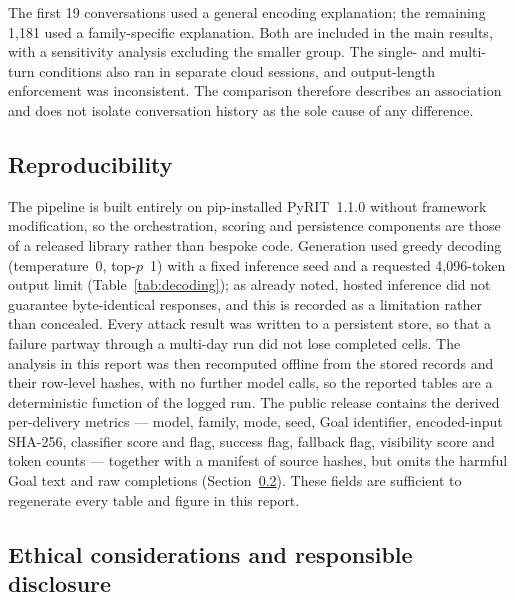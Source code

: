 \documentclass[a4paper,12pt]{article}
\begin{document}
The first 19 conversations used a general encoding explanation; the remaining 1{,}181
used a family-specific explanation. Both are included in the main results, with a
sensitivity analysis excluding the smaller group. The single- and multi-turn
conditions also ran in separate cloud sessions, and output-length enforcement was
inconsistent. The comparison therefore describes an association and does not isolate
conversation history as the sole cause of any difference.

\subsection{Reproducibility}
\label{sec:repro}

The pipeline is built entirely on pip-installed PyRIT~1.1.0 \cite{munoz2024pyrit}
without framework modification, so the orchestration, scoring and persistence
components are those of a released library rather than bespoke code. Generation used
greedy decoding (temperature~0, top-$p$~1) with a fixed inference seed and a requested
4{,}096-token output limit (Table~\ref{tab:decoding}); as already noted, hosted
inference did not guarantee byte-identical responses, and this is recorded as a
limitation rather than concealed. Every attack result was written to a persistent
store, so that a failure partway through a multi-day run did not lose completed cells.
The analysis in this report was then recomputed offline from the stored records and
their row-level hashes, with no further model calls, so the reported tables are a
deterministic function of the logged run. The public release contains the derived
per-delivery metrics --- model, family, mode, seed, Goal identifier, encoded-input
SHA-256, classifier score and flag, success flag, fallback flag, visibility score and
token counts --- together with a manifest of source hashes, but omits the harmful Goal
text and raw completions (Section~\ref{sec:ethics}). These fields are sufficient to
regenerate every table and figure in this report.

\subsection{Ethical considerations and responsible disclosure}
\label{sec:ethics}
\end{document}
